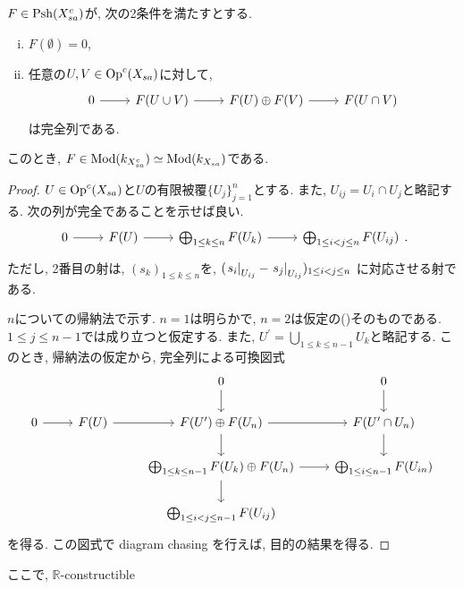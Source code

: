 \documentclass[../main]{subfiles}
\begin{document}
\begin{prop}
  $F\in\mathrm{Psh}(X_{sa}^c)$が, 次の2条件を満たすとする.
  \begin{enumerate}[(i)]
    \item $F(\emptyset)=0$,
    \item 任意の$U,V\in\mathrm{Op}^c(X_{sa})$に対して,
      \[
        \begin{tikzcd}
          0 \ar[r]
          & F(U \cup V) \ar[r]
          & F(U) \oplus F(V) \ar[r]
          & F(U \cap V)
        \end{tikzcd}
      \]
      は完全列である.
  \end{enumerate}
  このとき,
  $F\in\mathrm{Mod}(k_{X_{sa}^c})\simeq\mathrm{Mod}(k_{X_{sa}})$である.
\end{prop}
\begin{proof}
  $U\in\mathrm{Op}^c(X_{sa})$と$U$の有限被覆$\{U_j\}_{j=1}^{n}$とする.
  また, $U_{ij} = U_i \cap U_j$と略記する.
  次の列が完全であることを示せば良い.
  \[
    \begin{tikzcd}
      0 \ar[r]
      & F(U) \ar[r]
      & \bigoplus_{1 \leq k \leq n} F(U_k) \ar[r]
      & \bigoplus_{1 \leq i < j \leq n} F(U_{ij})
    \end{tikzcd}.
  \]
  ただし, 2番目の射は,
  $(s_k)_{1 \leq k \leq n}$を,
  $(\left.s_i\right|_{U_{ij}}-\left.s_j\right|_{U_{ij}})_{1 \leq i < j \leq n}$
  に対応させる射である.

  $n$についての帰納法で示す.
  $n=1$は明らかで, $n=2$は仮定の()そのものである.
  $1 \leq j \leq n-1$では成り立つと仮定する.
  また, $U^\prime = \bigcup_{1\leq k \leq n-1} U_k$と略記する.
  このとき, 帰納法の仮定から, 完全列による可換図式
  \[
    \begin{tikzcd}
      && 0 \ar[d] & 0 \ar[d]
      \\
      0 \ar[r]
      & F(U) \ar[r]
      & F(U^\prime) \oplus F(U_n) \ar[r] \ar[d]
      & F(U^\prime\cap U_n) \ar[d]
      \\
      &
      & \bigoplus_{1 \leq k \leq n-1} F(U_k) \oplus F(U_n) \ar[r] \ar[d]
      & \bigoplus_{1 \leq i \leq n-1} F(U_{in})
      \\
      &
      & \bigoplus_{1 \leq i < j \leq n-1} F(U_{ij})
      &
    \end{tikzcd}
  \]
  を得る.
  この図式で diagram chasing を行えば, 目的の結果を得る.
\end{proof}

ここで, $\mathbb{R}$-constructible
\end{document}
